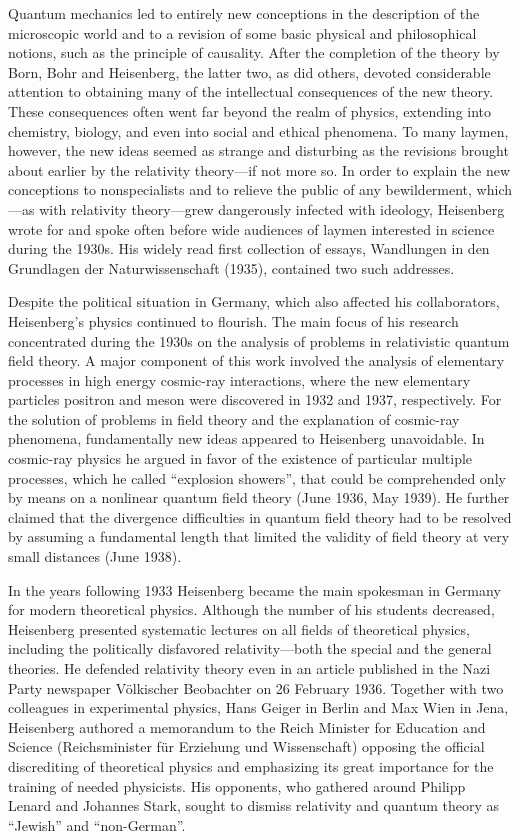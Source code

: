 \documentclass{article}
\begin{document}
Quantum mechanics led to entirely new conceptions in the description of the microscopic world and to a revision of some basic physical and philosophical notions, such as the principle of causality. After the completion of the theory by Born, Bohr and Heisenberg, the latter two, as did others, devoted considerable attention to obtaining many of the intellectual consequences of the new theory. These consequences often went far beyond the realm of physics, extending into chemistry, biology, and even into social and ethical phenomena. To many laymen, however, the new ideas seemed as strange and disturbing as the revisions brought about earlier by the relativity theory---if not more so. In order to explain the new conceptions to nonspecialists and to relieve the public of any bewilderment, which---as with relativity theory---grew dangerously infected with ideology, Heisenberg wrote for and spoke often before wide audiences of laymen interested in science during the 1930s. His widely read first collection of essays, Wandlungen in den Grundlagen der Naturwissenschaft (1935), contained two such addresses.

Despite the political situation in Germany, which also affected his collaborators, Heisenberg's physics continued to flourish. The main focus of his research concentrated during the 1930s on the analysis of problems in relativistic quantum field theory. A major component of this work involved the analysis of elementary processes in high energy cosmic-ray interactions, where the new elementary particles positron and meson were discovered in 1932 and 1937, respectively. For the solution of problems in field theory and the explanation of cosmic-ray phenomena, fundamentally new ideas appeared to Heisenberg unavoidable. In cosmic-ray physics he argued in favor of the existence of particular multiple processes, which he called “explosion showers”, that could be comprehended only by means on a nonlinear quantum field theory (June 1936, May 1939). He further claimed that the divergence difficulties in quantum field theory had to be resolved by assuming a fundamental length that limited the validity of field theory at very small distances (June 1938).

In the years following 1933 Heisenberg became the main spokesman in Germany for modern theoretical physics. Although the number of his students decreased, Heisenberg presented systematic lectures on all fields of theoretical physics, including the politically disfavored relativity---both the special and the general theories. He defended relativity theory even in an article published in the Nazi Party newspaper Völkischer Beobachter on 26 February 1936. Together with two colleagues in experimental physics, Hans Geiger in Berlin and Max Wien in Jena, Heisenberg authored a memorandum to the Reich Minister for Education and Science (Reichsminister für Erziehung und Wissenschaft) opposing the official discrediting of theoretical physics and emphasizing its great importance for the training of needed physicists. His opponents, who gathered around Philipp Lenard and Johannes Stark, sought to dismiss relativity and quantum theory as “Jewish” and “non-German”.
\end{document}
